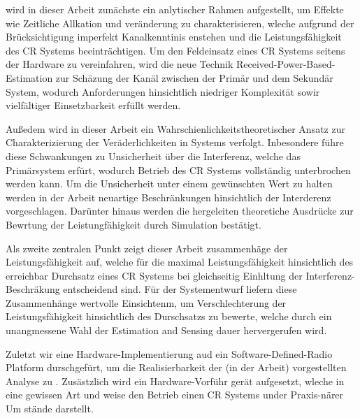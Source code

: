 wird in dieser Arbeit zun\"achste ein anlytischer Rahmen aufgestellt, um Effekte wie Zeitliche Allkation und ver\"anderung zu charakterisieren, wleche aufgrund der Br\"ucksichtigung imperfekt Kanalkenntinis enstehen und die Leistungsf\"ahigkeit des CR Systems beeintr\"achtigen. Um den Feldeinsatz eines CR Systems seitens der Hardware zu vereinfahren, wird die neue Technik Received-Power-Based-Estimation zur Sch\"azung der Kan\"al  zwischen der Prim\"ar und dem Sekund\"ar System, wodurch Anforderungen hinsichtlich niedriger Komplexit\"at sowir vielf\"altiger Einsetzbarkeit erf\"ullt werden. 

Au\ss edem wird in dieser Arbeit ein Wahrschienlichkeitstheoretischer Ansatz zur Charakterizierung der Ver\"aderlichkeiten in Systems verfolgt. Inbesondere f\"uhre diese Schwankungen zu Unsicherheit \"uber die Interferenz, welche das Prim\"arsystem erf\"urt, wodurch Betrieb des CR Systems vollst\"andig unterbrochen werden kann. Um die Unsicherheit unter einem gew\"unschten Wert zu halten werden in der Arbeit neuartige Beschr\"ankungen hinsichtlich der Interderenz vorgeschlagen. Dar\"unter hinaus werden die hergeleiten theoretiche Ausdr\"ucke zur Bewrtung der Leistungf\"ahigkeit durch Simulation best\"atigt. 

Als zweite zentralen Punkt zeigt dieser Arbeit zusammenh\"age der Leistungsf\"ahigkeit auf, welche f\"ur die maximal Leistungsf\"ahigkeit hinsichtlich des erreichbar Durchsatz eines CR Systems bei gleichseitig Einhltung der Interferenz-Beschr\"akung entscheidend sind. F\"ur der Systementwurf liefern diese Zusammenh\"ange wertvolle Einsichtenm, um Verschlechterung der Leistungsf\"ahigkeit hinsichtlich des Durschsatzs zu bewerte, welche durch ein unangmessene Wahl der Estimation and Sensing dauer hervergerufen wird.

Zuletzt wir eine Hardware-Implementierung aud ein Software-Defined-Radio Platform durschgef\"urt, um die Realisierbarkeit der (in der Arbeit) vorgestellten Analyse zu  . Zus\"astzlich wird ein Hardware-Vorf\"uhr ger\"at aufgesetzt, wleche in eine gewissen Art und weise den Betrieb einen CR Systems under Praxis-n\"arer Um st\"ande darstellt.

\cleardoublepage

